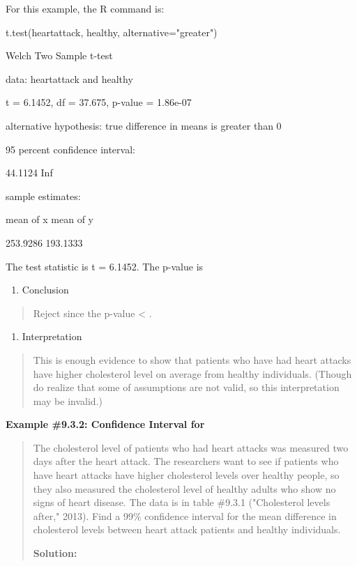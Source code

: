 \documentclass[]{book}
\providecommand{\tightlist}{%
  \setlength{\itemsep}{0pt}\setlength{\parskip}{0pt}}
\begin{document}
For this example, the R command is:

t.test(heartattack, healthy, alternative="greater")

Welch Two Sample t-test

data: heartattack and healthy

t = 6.1452, df = 37.675, p-value = 1.86e-07

alternative hypothesis: true difference in means is greater than 0

95 percent confidence interval:

44.1124 Inf

sample estimates:

mean of x mean of y

253.9286 193.1333

The test statistic is t = 6.1452. The p-value is

\begin{enumerate}
\def\labelenumi{\arabic{enumi}.}
\setcounter{enumi}{4}
\tightlist
\item
  Conclusion
\end{enumerate}

\begin{quote}
Reject since the p-value \textless{} .
\end{quote}

\begin{enumerate}
\def\labelenumi{\arabic{enumi}.}
\setcounter{enumi}{5}
\tightlist
\item
  Interpretation
\end{enumerate}

\begin{quote}
This is enough evidence to show that patients who have had heart attacks have higher cholesterol level on average from healthy individuals. (Though do realize that some of assumptions are not valid, so this interpretation may be invalid.)
\end{quote}

\textbf{Example \#9.3.2: Confidence Interval for }

\begin{quote}
The cholesterol level of patients who had heart attacks was measured two days after the heart attack. The researchers want to see if patients who have heart attacks have higher cholesterol levels over healthy people, so they also measured the cholesterol level of healthy adults who show no signs of heart disease. The data is in table \#9.3.1 ("Cholesterol levels after," 2013). Find a 99\% confidence interval for the mean difference in cholesterol levels between heart attack patients and healthy individuals.

\textbf{Solution:}
\end{quote}
\end{document}

